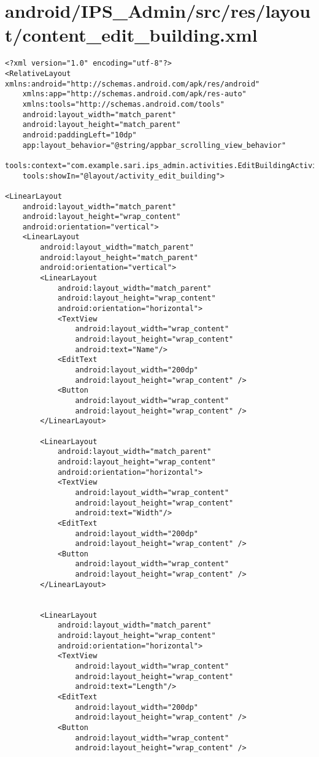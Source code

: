 \section{android/IPS\_Admin/src/res/layout/content\_edit\_building.xml}
\begin{lstlisting}<?xml version="1.0" encoding="utf-8"?>
<RelativeLayout xmlns:android="http://schemas.android.com/apk/res/android"
    xmlns:app="http://schemas.android.com/apk/res-auto"
    xmlns:tools="http://schemas.android.com/tools"
    android:layout_width="match_parent"
    android:layout_height="match_parent"
    android:paddingLeft="10dp"
    app:layout_behavior="@string/appbar_scrolling_view_behavior"
    tools:context="com.example.sari.ips_admin.activities.EditBuildingActivity"
    tools:showIn="@layout/activity_edit_building">

<LinearLayout
    android:layout_width="match_parent"
    android:layout_height="wrap_content"
    android:orientation="vertical">
    <LinearLayout
        android:layout_width="match_parent"
        android:layout_height="match_parent"
        android:orientation="vertical">
        <LinearLayout
            android:layout_width="match_parent"
            android:layout_height="wrap_content"
            android:orientation="horizontal">
            <TextView
                android:layout_width="wrap_content"
                android:layout_height="wrap_content"
                android:text="Name"/>
            <EditText
                android:layout_width="200dp"
                android:layout_height="wrap_content" />
            <Button
                android:layout_width="wrap_content"
                android:layout_height="wrap_content" />
        </LinearLayout>

        <LinearLayout
            android:layout_width="match_parent"
            android:layout_height="wrap_content"
            android:orientation="horizontal">
            <TextView
                android:layout_width="wrap_content"
                android:layout_height="wrap_content"
                android:text="Width"/>
            <EditText
                android:layout_width="200dp"
                android:layout_height="wrap_content" />
            <Button
                android:layout_width="wrap_content"
                android:layout_height="wrap_content" />
        </LinearLayout>


        <LinearLayout
            android:layout_width="match_parent"
            android:layout_height="wrap_content"
            android:orientation="horizontal">
            <TextView
                android:layout_width="wrap_content"
                android:layout_height="wrap_content"
                android:text="Length"/>
            <EditText
                android:layout_width="200dp"
                android:layout_height="wrap_content" />
            <Button
                android:layout_width="wrap_content"
                android:layout_height="wrap_content" />


\end{lstlisting}
